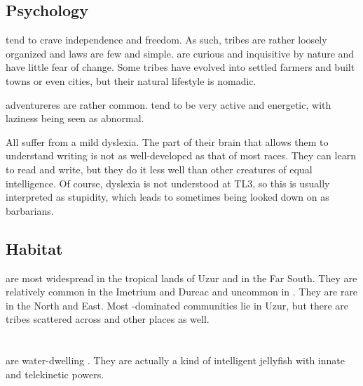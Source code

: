 \subsection{Psychology}
\Meccara{} tend to crave independence and freedom. As such, \meccaran{} tribes are rather loosely organized and laws are few and simple. \Meccara{} are curious and inquisitive by nature and have little fear of change. Some tribes have evolved into settled farmers and built towns or even cities, but their natural lifestyle is nomadic. 

\Meccaran{} adventureres are rather common. \Meccara{} tend to be very active and energetic, with laziness being seen as abnormal. 

All \meccara{} suffer from a mild dyslexia. The part of their brain that allows them to understand writing is not as well-developed as that of most races. They can learn to read and write, but they do it less well than other creatures of equal intelligence. Of course, dyslexia is not understood at TL3, so this is usually interpreted as stupidity, which leads to \meccarans{} sometimes being looked down on as barbarians. 









\subsection{Habitat}
\Meccara{} are most widespread in the tropical lands of Uzur and in the Far South. They are relatively common in the Imetrium and Durcac and uncommon in \Velcad{}. They are rare in the North and East. Most \meccara{}-dominated communities lie in Uzur, but there are \meccaran{} tribes scattered across \Velcad{} and other places as well. 















\section{\Naiad}
\index{\naiad}
\Naiads{} are water-dwelling . 
They are actually a kind of intelligent jellyfish with innate  and telekinetic powers. 

